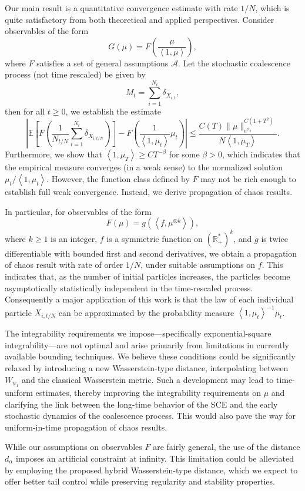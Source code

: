 \documentclass[11pt,a4paper]{article}
\newcommand{\brac}[1]{\left\langle#1\right\rangle}
\begin{document}
Our main result is a quantitative convergence estimate with rate $1/N$, which is quite satisfactory from both theoretical and applied perspectives. Consider observables of the form
\[
G(\mu) = F\left( \frac{\mu}{\brac{1,\mu}} \right),
\]
where $F$ satisfies a set of general assumptions $\mathcal{A}$. Let the stochastic coalescence process (not time rescaled) be given by
\[
M_t =  \sum_{i=1}^{N_t} \delta_{X_{i,t}},
\]
then for all $t \geq 0$, we establish the estimate
\[
\left| \mathbb{E} \left[ F\left( \frac{1}{N_{t/N}} \sum_{i=1}^{N_t} \delta_{X_{i,t/N}} \right) \right] - F\left( \frac{1}{\brac{1,\mu_t}} \mu_t \right) \right| \leq \frac{C(T) \|\mu\|_{e^{\psi_2}}^{C(1 + T^2)}}{N \brac{1,\mu_T}}.
\]
Furthermore, we show that $\brac{1,\mu_T} \geq C T^{-\beta}$ for some $\beta > 0$, which indicates that the empirical measure converges (in a weak sense) to the normalized solution $\mu_t / \brac{1,\mu_t}$. However, the function class defined by $F$ may not be rich enough to establish full weak convergence. Instead, we derive propagation of chaos results.

In particular, for observables of the form
\[
F(\mu) = g\left( \left\langle f, \mu^{\otimes k} \right\rangle \right),
\]
where $k \geq 1$ is an integer, $f$ is a symmetric function on $(\mathbb{R}_+^*)^k$, and $g$ is twice differentiable with bounded first and second derivatives, we obtain a propagation of chaos result with rate of order $1/N$, under suitable assumptions on $f$. This indicates that, as the number of initial particles increases, the particles become asymptotically statistically independent in the time-rescaled process. Consequently a major application of this work is that the law of each individual particle $X_{i,t/N}$ can be approximated by the probability measure $\brac{1,\mu_t}^{-1} \mu_t$.

The integrability requirements we impose—specifically exponential-square integrability—are not optimal and arise primarily from limitations in currently available bounding techniques. We believe these conditions could be significantly relaxed by introducing a new Wasserstein-type distance, interpolating between $W_{\psi_1}$ and the classical Wasserstein metric. Such a development may lead to time-uniform estimates, thereby improving the integrability requirements on $\mu$ and clarifying the link between the long-time behavior of the SCE and the early stochastic dynamics of the coalescence process. This would also pave the way for uniform-in-time propagation of chaos results.

While our assumptions on observables $F$ are fairly general, the use of the distance $d_\alpha$ imposes an artificial constraint at infinity. This limitation could be alleviated by employing the proposed hybrid Wasserstein-type distance, which we expect to offer better tail control while preserving regularity and stability properties.
\end{document}
